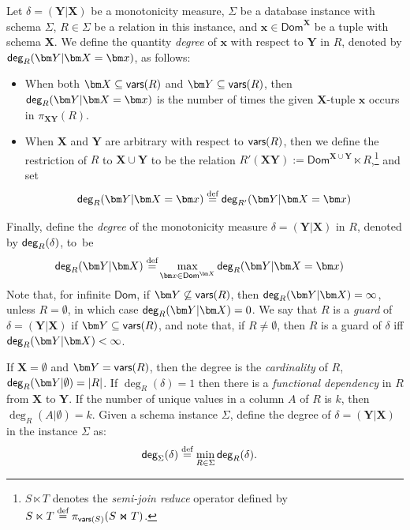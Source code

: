 \documentclass{theoretics}
\newcommand{\dom}{\textsf{Dom}}
\newcommand{\degree}{\text{\sf deg}}
\newcommand{\defeq}{\stackrel{\text{def}}{=}}
\newcommand{\vars}{\text{\sf vars}}
\begin{document}
Let $\delta = (\bm Y|\bm X)$ be a monotonicity measure,
$\Sigma$ be a database instance with schema $\Sigma$,
$R \in \Sigma$ be a relation in this instance,
and $\bm x \in \dom^{\bm X}$ be a tuple with schema $\bm X$.
We define the quantity {\em degree} of $\bm x$ with respect to $\bm Y$ in $R$, denoted by
$\degree_{R}(\bm Y | \bm X = \bm x)$, as follows:
\begin{itemize}
  \item When both $\bm X \subseteq \vars(R)$ and $\bm Y \subseteq \vars(R)$,
then $\degree_{R}(\bm Y|\bm X = \bm x)$ is the number of times the given
$\bm X$-tuple $\bm x$ occurs in $\pi_{\bm X\bm Y}(R)$.
  \item When $\bm X$ and $\bm Y$ are arbitrary with respect to $\vars(R)$, then we define
the restriction of $R$ to $\bm X \cup \bm Y$ to be the relation
$R'(\bm X\bm Y) := \dom^{\bm X \cup \bm Y} \ltimes R$,\footnote{$S \ltimes T$ denotes
the {\em semi-join reduce} operator defined by $S \ltimes T \defeq \pi_{\vars(S)}(S \Join T)$.} and set
  \[
\degree_{R}(\bm Y | \bm X = \bm x) \defeq \degree_{R'}(\bm Y | \bm X = \bm x)
  \]
\end{itemize}
Finally, define the {\em degree} of the monotonicity measure $\delta = (\bm Y|\bm X)$ in $R$,
denoted by $\degree_{R}(\delta)$, to~be
\begin{align}
    \degree_{R}(\bm Y|\bm X) \defeq & \max_{\bm x \in \dom^{\bm X}} \degree_{R}(\bm Y|\bm X = \bm x) \label{eq:degree:delta}
\end{align}
Note that, for infinite $\dom$, if $\bm Y \not\subseteq \vars(R)$, then $\degree_{R}(\bm Y|\bm X)=\infty$, unless
$R=\emptyset$, in which case $\degree_{R}(\bm Y|\bm X)=0$. We say that $R$ is a {\em guard}
of $\delta = (\bm Y|\bm X)$ if $\bm Y \subseteq \vars(R)$, and note that, if $R \neq
\emptyset$, then $R$ is a guard of $\delta$ iff $\degree_{R}(\bm Y|\bm X)< \infty$.

If $\bm X=\emptyset$ and $\bm Y = \vars(R)$, then the degree is the {\em cardinality} of
$R$, $\degree_{R}(\bm Y|\emptyset) = |R|$. If $\deg_R(\delta)=1$ then there is a {\em
functional dependency} in $R$ from $\bm X$ to $\bm Y$. If the number of unique values in a
column $A$ of $R$ is $k$, then $\deg_R(A|\emptyset)=k$. Given a schema instance $\Sigma$,
define the degree of $\delta = (\bm Y|\bm X)$ in the instance $\Sigma$ as:
%
\begin{align}
  \degree_{\Sigma}(\delta) &\defeq \min_{R \in \Sigma}\degree_{R}(\delta).
  \label{eqn:degree:sigma}
\end{align}
\end{document}
